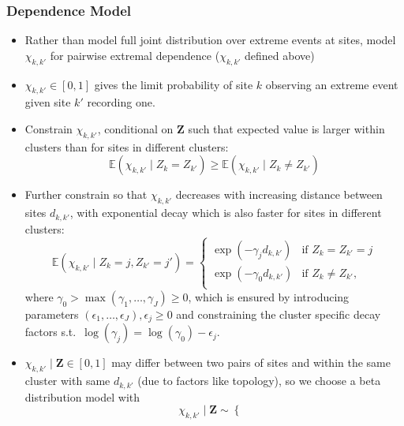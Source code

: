 \documentclass{article}
\begin{document}
\begin{itemize}
\subsubsection{Dependence Model}

\begin{itemize}
  \item Rather than model full joint distribution over extreme events at sites, model $\chi_{k, k'}$ for pairwise extremal dependence ($\chi_{k, k'}$ defined above) 
  \item $\chi_{k, k'} \in [0, 1]$ gives the limit probability of site $k$ observing an extreme event given site $k'$ recording one. 
  \item Constrain $\chi_{k, k'}$, conditional on $\bm{Z}$ such that expected value is larger within clusters than for sites in different clusters: 
  \begin{equation} \label{eq:chi_exp}
    \mathbb{E}(\chi_{k, k'} \mid Z_k = Z_{k'}) \ge \mathbb{E}(\chi_{k, k'} \mid Z_k \ne Z_{k'})
  \end{equation}
  \item Further constrain so that $\chi_{k, k'}$ decreases with increasing distance between sites $d_{k, k'}$, with exponential decay which is also faster for sites in different clusters:
  \begin{equation} \label{eq:chi_dist}
    \mathbb{E}(\chi_{k, k'} \mid Z_k = j, Z_{k'} = j') = \begin{cases}
      \exp(-\gamma_j d_{k, k'}) &\text{if } Z_k = Z_{k'} = j \\
      \exp(-\gamma_0 d_{k, k'}) &\text{if } Z_k \ne Z_{k'}, \\
    \end{cases}
  \end{equation}
  where $\gamma_0 > \max(\gamma_1, \ldots, \gamma_J) \ge 0$, which is ensured by introducing parameters $(\epsilon_1, \ldots, \epsilon_J), \epsilon_j \ge 0$ and constraining the cluster specific decay factors s.t.\ $\log(\gamma_j) = \log(\gamma_0) - \epsilon_j$.
\item $\chi_{k, k'} \mid \bm{Z} \in [0, 1]$ may differ between two pairs of sites and within the same cluster with same $d_{k, k'}$ (due to factors like topology), so we choose a beta distribution model with 
  \begin{equation} \label{eq:beta_mod}
    \chi_{k, k'} \mid \bm{Z} \sim \begin{cases}

\end{cases}
\end{equation}
\end{itemize}
\end{itemize}
\end{document}
